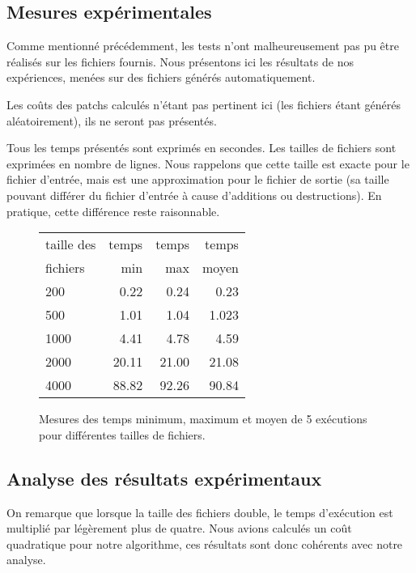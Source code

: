 \documentclass[a4paper, 10pt, french]{article}
\begin{document}
  \subsection{Mesures expérimentales}
    Comme mentionné précédemment, les tests n'ont malheureusement pas pu être réalisés
    sur les fichiers fournis.
    Nous présentons ici les résultats de nos expériences, menées sur des fichiers
    générés automatiquement.

    Les coûts des patchs calculés n'étant pas pertinent ici (les fichiers étant
    générés aléatoirement), ils ne seront pas présentés.

    Tous les temps présentés sont exprimés en secondes. Les tailles de fichiers
    sont exprimées en nombre de lignes. Nous rappelons que cette taille est exacte
    pour le fichier d'entrée, mais est une approximation pour le fichier de sortie
    (sa taille pouvant différer du fichier d'entrée à cause d'additions ou destructions).
    En pratique, cette différence reste raisonnable.

    \begin{figure}[h]
      \begin{center}
        \begin{tabular}{|l||r|r|r||}
          \hline
          \hline
            taille des &   temps     & temps   & temps \\
            fichiers &   min       & max     & moyen \\
          \hline
          \hline
            200 &  0.22      &   0.24  &  0.23   \\
          \hline
            500 &  1.01      &   1.04  &  1.023   \\
          \hline
            1000 &   4.41     &  4.78   &  4.59   \\
          \hline
            2000 & 20.11   &  21.00   &  21.08   \\
          \hline
            4000 & 88.82  &    92.26   &  90.84  \\
          \hline
          \hline
        \end{tabular}
        \caption{Mesures des temps minimum, maximum et moyen de 5 exécutions pour différentes tailles de fichiers.}
        \label{table-temps}
      \end{center}
    \end{figure}

\subsection{Analyse des résultats expérimentaux}
On remarque que lorsque la taille des fichiers double, le temps d'exécution est
multiplié par légèrement plus de quatre. Nous avions calculés un coût quadratique
pour notre algorithme, ces résultats sont donc cohérents avec notre analyse.
\end{document}
